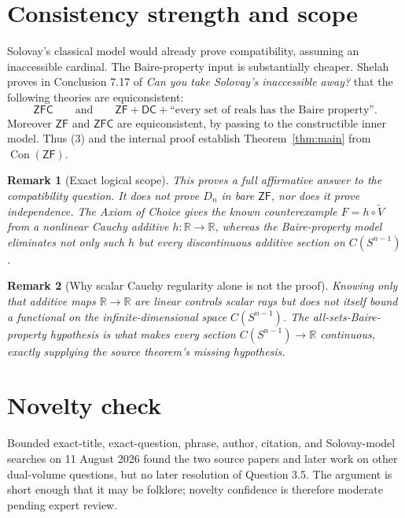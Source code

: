 \documentclass[11pt]{article}
\newtheorem{remark}{Remark}
\newcommand{\ZF}{\mathsf{ZF}}
\newcommand{\DC}{\mathsf{DC}}
\newcommand{\R}{\mathbb R}
\newcommand{\Sph}{S^{n-1}}
\newcommand{\C}{C(\Sph)}
\newcommand{\Vt}{\widetilde V}
\begin{document}
\section{Consistency strength and scope}

Solovay's classical model would already prove compatibility, assuming an
inaccessible cardinal.  The Baire-property input is substantially cheaper.
Shelah proves in Conclusion 7.17 of \emph{Can you take Solovay's inaccessible
away?} that the following theories are equiconsistent:
\[
 \mathsf{ZFC}\qquad\text{and}\qquad
 \ZF+\DC+\text{``every set of reals has the Baire property''.}  \tag{3}
\]
Moreover $\ZF$ and $\mathsf{ZFC}$ are equiconsistent, by passing to the
constructible inner model.  Thus (3) and the internal proof establish
Theorem~\ref{thm:main} from $\operatorname{Con}(\ZF)$.

\begin{remark}[Exact logical scope]
This proves a full affirmative answer to the compatibility question.  It does
not prove $D_n$ in bare $\ZF$, nor does it prove independence.  The Axiom of
Choice gives the known counterexample $F=h\circ\Vt$ from a nonlinear Cauchy
additive $h:\R\to\R$, whereas the Baire-property model eliminates not only
such $h$ but every discontinuous additive section on $\C$.
\end{remark}

\begin{remark}[Why scalar Cauchy regularity alone is not the proof]
Knowing only that additive maps $\R\to\R$ are linear controls scalar rays but
does not itself bound a functional on the infinite-dimensional space $\C$.
The all-sets-Baire-property hypothesis is what makes every section
$\C\to\R$ continuous, exactly supplying the source theorem's missing
hypothesis.
\end{remark}

\section*{Novelty check}

Bounded exact-title, exact-question, phrase, author, citation, and Solovay-model
searches on 11 August 2026 found the two source papers and later work on other
dual-volume questions, but no later resolution of Question 3.5.  The argument
is short enough that it may be folklore; novelty confidence is therefore
moderate pending expert review.
\end{document}

